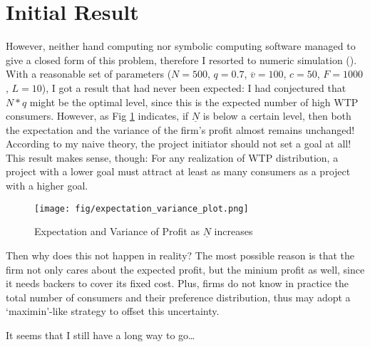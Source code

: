 \documentclass{article}
\begin{document}
\section{Initial Result}
However, neither hand computing nor
symbolic computing software managed to give
a closed form of this problem, therefore I
resorted to numeric simulation ().
With a reasonable set of parameters
($N=500$, $q=0.7$, $\overline{v}=100$, $c=50$, $F=1000$, $L=10$),
I got a result that had never been expected:
I had conjectured that
$N*q$ might be the optimal level, since this
is the expected number of high WTP consumers.
However, as Fig \ref{fig:expectation and variance of profit}
indicates, if $\underline{N}$ is
below a certain level, then both the expectation
and the variance of the firm's profit almost
remains unchanged! According to my naive
theory, the project initiator should not
set a goal at all! This result makes sense,
though: For any realization of WTP
distribution, a project with a lower goal
must attract at least as many consumers as
a project with a higher goal.

\begin{figure}[H]
    \label{fig:expectation and variance of profit}
    \centering
    \caption{Expectation and Variance of Profit as $\underline{N}$ increases}
    \texttt{[image: fig/expectation\_variance\_plot.png]}
\end{figure}

Then why does this not happen in reality?
The most possible reason is that
the firm not only cares about the
expected profit, but the minium
profit as well, since it needs
backers to cover its fixed cost.
Plus, firms do not know in practice
the total number of consumers and
their preference distribution, thus
may adopt a `maximin'-like strategy
to offset this uncertainty.

It seems that I still have a long way to
go\dots
\end{document}
